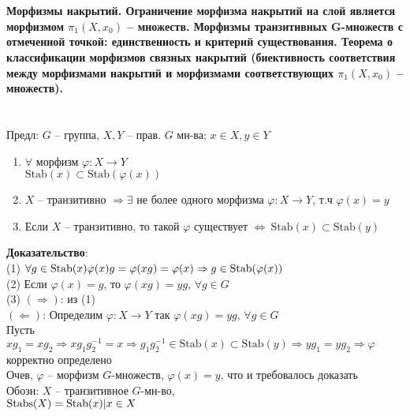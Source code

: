 \newpage
	\section{}
	\textbf{Морфизмы накрытий. Ограничение морфизма накрытий на слой является морфизмом $\pi_1(X, x_0)$ -- множеств. Морфизмы транзитивных G-множеств с отмеченной точкой: единственность и критерий существования. Теорема о классификации морфизмов связных накрытий (биективность соответствия между морфизмами накрытий и морфизмами соответствующих $\pi_1(X, x_0)$ -- множеств).}\\
	\\	
	\\
	Предл: $G$ -- группа, $X, Y$ -- прав. $G$ мн-ва; $x \in X, y \in Y$\\
	\begin{enumerate}
		\item $\forall$ морфизм $\varphi: X \rightarrow Y$\\
		$\text{Stab}(x) \subset \text{Stab}(\varphi(x))$
		\item $X$ -- транзитивно $\Rightarrow \exists$ не более одного морфизма $\varphi: X \rightarrow Y$, т.ч $\varphi(x) = y$
		\item Если $X$ -- транзитивно, то такой $\varphi$ существует $\Leftrightarrow\ \text{Stab}(x) \subset \text{Stab}(y)$
	\end{enumerate}
	\textbf{Доказательство}:\\ 
	(1) $\forall g \in \text{Stab}(x)\\
	\varphi(x)g = \varphi(xg) = \varphi(x) \Rightarrow g \in \text{Stab}(\varphi(x))$\\
	(2) Если $\varphi(x) = g$, то $\varphi(xg) = yg$, $\forall g \in G$\\
	(3) $(\Rightarrow)$: из (1)\\
	$(\Leftarrow)$: Определим $\varphi: X \rightarrow Y$ так $\varphi(xg) = yg$, $\forall g \in G$\\
	Пусть $xg_1 = xg_2 \Rightarrow xg_1g_2^{-1} = x \Rightarrow g_1g_2^{-1} \in \text{Stab}(x) \subset \text{Stab}(y) \Rightarrow yg_1 = yg_2 \Rightarrow \varphi$ корректно определено\\
	Очев, $\varphi$ -- морфизм $G$-множеств, $\varphi(x) = y$, что и требовалось доказать\\
	Обозн: $X$ -- транзитивное $G$-мн-во,\\
	$\text{\text{Stabs}}(X) = \text{Stab}(x)|x \in X$\\

